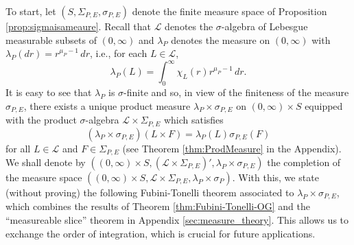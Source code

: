 \documentclass[11pt, letter]{book}
\begin{document}
\noindent To start, let $(S,\Sigma_{P,E},\sigma_{P,E})$ denote the finite measure space of Proposition \ref{prop:sigmaisameaure}. Recall that $\mathcal{L}$ denotes the $\sigma$-algebra of Lebesgue measurable subsets of $(0,\infty)$ and  $\lambda_P$ denotes the measure on $(0,\infty)$ with $\lambda_P(dr)=r^{\mu_P-1}\,dr$, i.e., for each $L\in\mathcal{L}$,
\begin{equation*}
\lambda_P(L)=\int_0^\infty \chi_L(r)r^{\mu_P-1}\,dr.
\end{equation*}
It is easy to see that $\lambda_P$ is $\sigma$-finite and so, in view of the finiteness of the measure $\sigma_{P,E}$, there exists a unique product measure $\lambda_P\times\sigma_{P,E}$ on $(0,\infty)\times S$ equipped with the product $\sigma$-algebra $\mathcal{L}\times\Sigma_{P,E}$ which satisfies
\begin{equation*}
    (\lambda_P\times\sigma_{P,E})(L\times F)=\lambda_P(L)\sigma_{P,E}(F)
\end{equation*}
for all $L\in\mathcal{L}$ and $F\in\Sigma_{P,E}$ (see Theorem \ref{thm:ProdMeasure} in the Appendix). We shall denote by $((0,\infty)\times S,(\mathcal{L}\times\Sigma_{P,E})', \lambda_P\times\sigma_{P,E})$ the completion of the measure space $((0,\infty)\times S,\mathcal{L}\times\Sigma_{P,E},\lambda_P \times\sigma_P)$. With this, we state (without proving) the following Fubini-Tonelli theorem associated to $\lambda_P\times \sigma_{P,E}$, which combines the results of Theorem \ref{thm:Fubini-Tonelli-OG} and the ``measureable slice'' theorem in Appendix \ref{sec:measure_theory}. This allows us to exchange the order of integration, which is crucial for future applications.
\end{document}

